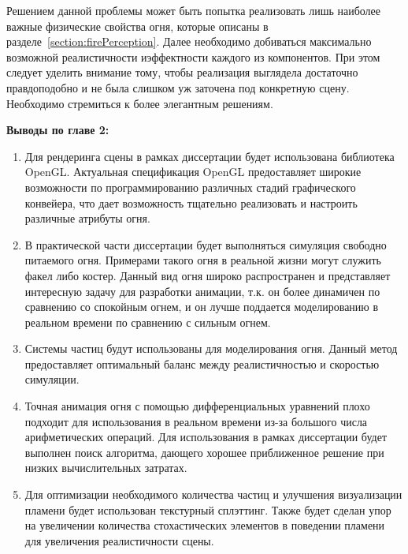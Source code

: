 Решением данной проблемы может быть попытка реализовать лишь наиболее важные
физические свойства огня, которые описаны в
разделе~\ref{section:firePerception}. Далее необходимо добиваться максимально
возможной реалистичности и\break{}эффектности каждого из компонентов. При этом
следует уделить внимание тому, чтобы реализация выглядела достаточно
правдоподобно и не была слишком уж заточена под конкретную сцену. Необходимо
стремиться к более элегантным решениям.

\textbf{Выводы по главе 2:}
\begin{enumerate}
    \item Для рендеринга сцены в рамках диссертации будет использована
        библиотека OpenGL\@. Актуальная спецификация OpenGL предоставляет
        широкие возможности по программированию различных стадий графического
        конвейера, что дает возможность тщательно реализовать и настроить
        различные атрибуты огня.
    \item В практической части диссертации будет выполняться симуляция свободно
        питаемого огня. Примерами такого огня в реальной жизни могут служить
        факел либо костер.  Данный вид огня широко распространен и
        представляет интересную задачу для разработки анимации, т\@.к\@. он
        более динамичен по сравнению со спокойным огнем, и он лучше поддается
        моделированию в реальном времени по сравнению с сильным огнем.
    \item Системы частиц будут использованы для моделирования огня. Данный метод
        предоставляет оптимальный баланс между реалистичностью и скоростью
        симуляции.
    \item Точная анимация огня с помощью дифференциальных уравнений плохо
        подходит для использования в реальном времени из-за большого
        числа\break{} арифметических операций. Для использования в рамках
        диссертации будет выполнен поиск алгоритма, дающего хорошее приближенное
        решение при низких вычислительных затратах.
    \item Для оптимизации необходимого количества частиц и улучшения
        визуализации пламени будет использован текстурный сплэттинг. Также будет
        сделан упор на увеличении количества стохастических элементов в
        поведении пламени для увеличения реалистичности сцены.
\end{enumerate}

